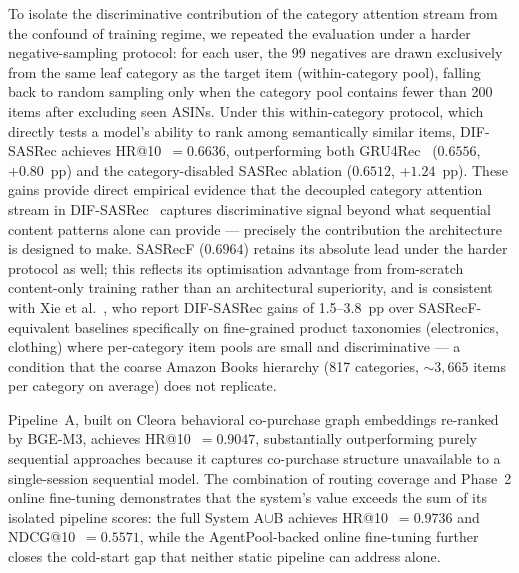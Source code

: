 To isolate the discriminative contribution of the category attention stream from the confound
of training regime, we repeated the evaluation under a harder negative-sampling protocol:
for each user, the 99 negatives are drawn exclusively from the same leaf category as the
target item (within-category pool), falling back to random sampling only when the category
pool contains fewer than 200 items after excluding seen ASINs.
Under this within-category protocol, which directly tests a model's ability to rank among
semantically similar items, DIF-SASRec achieves HR@10~$=0.6636$, outperforming both
GRU4Rec~\cite{hidasi2016gru4rec} ($0.6556$, $+0.80$~pp) and the category-disabled SASRec
ablation ($0.6512$, $+1.24$~pp).
These gains provide direct empirical evidence that the decoupled category attention stream
in DIF-SASRec~\cite{xie2022difsasrec} captures discriminative signal beyond what sequential
content patterns alone can provide --- precisely the contribution the architecture is designed
to make.
SASRecF ($0.6964$) retains its absolute lead under the harder protocol as well; this reflects
its optimisation advantage from from-scratch content-only training rather than an architectural
superiority, and is consistent with Xie et al.~\cite{xie2022difsasrec}, who report DIF-SASRec
gains of 1.5--3.8~pp over SASRecF-equivalent baselines specifically on fine-grained product
taxonomies (electronics, clothing) where per-category item pools are small and discriminative
--- a condition that the coarse Amazon Books hierarchy (817 categories,
${\sim}3{,}665$ items per category on average) does not replicate.

Pipeline~A, built on Cleora behavioral co-purchase graph embeddings re-ranked by BGE-M3,
achieves HR@10~$=0.9047$, substantially outperforming purely sequential approaches because
it captures co-purchase structure unavailable to a single-session sequential model.
The combination of routing coverage and Phase~2 online fine-tuning demonstrates that the
system's value exceeds the sum of its isolated pipeline scores: the full System A$\cup$B
achieves HR@10~$=0.9736$ and NDCG@10~$=0.5571$, while the AgentPool-backed online fine-tuning
further closes the cold-start gap that neither static pipeline can address alone.


